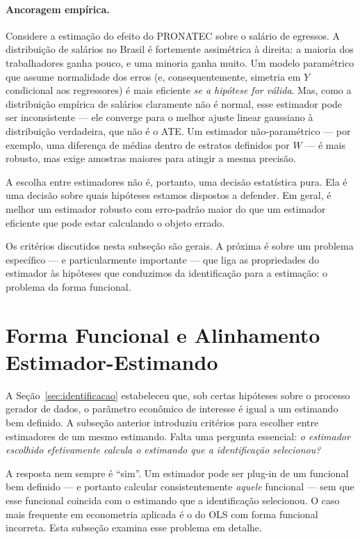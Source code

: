 \paragraph{Ancoragem empírica.} Considere a estimação do efeito do PRONATEC sobre o salário de egressos. A distribuição de salários no Brasil é fortemente assimétrica à direita: a maioria dos trabalhadores ganha pouco, e uma minoria ganha muito. Um modelo paramétrico que assume normalidade dos erros (e, consequentemente, simetria em $Y$ condicional aos regressores) é mais eficiente \textit{se a hipótese for válida}. Mas, como a distribuição empírica de salários claramente não é normal, esse estimador pode ser inconsistente --- ele converge para o melhor ajuste linear gaussiano à distribuição verdadeira, que não é o ATE. Um estimador não-paramétrico --- por exemplo, uma diferença de médias dentro de estratos definidos por $W$ --- é mais robusto, mas exige amostras maiores para atingir a mesma precisão.

A escolha entre estimadores não é, portanto, uma decisão estatística pura. Ela é uma decisão sobre quais hipóteses estamos dispostos a defender. Em geral, é melhor um estimador robusto com erro-padrão maior do que um estimador eficiente que pode estar calculando o objeto errado.

\bigskip

Os critérios discutidos nesta subseção são gerais. A próxima é sobre um problema específico --- e particularmente importante --- que liga as propriedades do estimador às hipóteses que conduzimos da identificação para a estimação: o problema da forma funcional.

\section{Forma Funcional e Alinhamento Estimador-Estimando}
\label{subsec:forma-funcional}

A Seção~\ref{sec:identificacao} estabeleceu que, sob certas hipóteses sobre o processo gerador de dados, o parâmetro econômico de interesse é igual a um estimando bem definido. A subseção anterior introduziu critérios para escolher entre estimadores de um mesmo estimando. Falta uma pergunta essencial: \textit{o estimador escolhido efetivamente calcula o estimando que a identificação selecionou?}

A resposta nem sempre é ``sim''. Um estimador pode ser plug-in de um funcional bem definido --- e portanto calcular consistentemente \textit{aquele} funcional --- sem que esse funcional coincida com o estimando que a identificação selecionou. O caso mais frequente em econometria aplicada é o do OLS com forma funcional incorreta. Esta subseção examina esse problema em detalhe.

